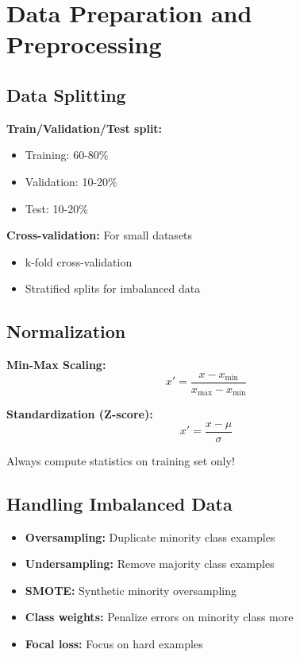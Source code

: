 
\section{Data Preparation and Preprocessing }
\label{sec:data-preparation}

\subsection{Data Splitting}

\textbf{Train/Validation/Test split:}
\begin{itemize}
    \item Training: 60-80\%
    \item Validation: 10-20\%
    \item Test: 10-20\%
\end{itemize}

\textbf{Cross-validation:} For small datasets
\begin{itemize}
    \item k-fold cross-validation
    \item Stratified splits for imbalanced data
\end{itemize}

\subsection{Normalization}

\textbf{Min-Max Scaling:}
\begin{equation}
x' = \frac{x - x_{\min}}{x_{\max} - x_{\min}}
\end{equation}

\textbf{Standardization (Z-score):}
\begin{equation}
x' = \frac{x - \mu}{\sigma}
\end{equation}

Always compute statistics on training set only! 

\subsection{Handling Imbalanced Data}

\begin{itemize}
    \item \textbf{Oversampling:} Duplicate minority class examples
    \item \textbf{Undersampling:} Remove majority class examples
    \item \textbf{SMOTE:} Synthetic minority oversampling
    \item \textbf{Class weights:} Penalize errors on minority class more
    \item \textbf{Focal loss:} Focus on hard examples
\end{itemize}

